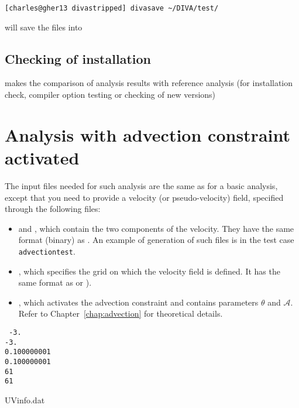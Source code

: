 \example
\begin{lstlisting}[style=Bash]
[charles@gher13 divastripped] divasave ~/DIVA/test/
\end{lstlisting}
will save the files into 

\subsection{Checking of installation}

 makes the comparison of analysis results with reference analysis (for
installation check, compiler option testing or checking of new versions)



\section{Analysis with advection constraint activated}

The input files needed for such analysis are the same as for a basic analysis, except that you need to provide a velocity (or pseudo-velocity) field, specified through the following files:
\begin{itemize}
\item {} and , which contain the two components of the velocity. They have the same format (binary) as . An example of generation of such files is in the test case {\tt advectiontest}.
\item {}, which specifies the grid on which the velocity field is defined. It has the same format as  or ).
\item {}, which activates the advection constraint and contains parameters $\theta$ and $\mathcal{A}$. Refer to Chapter~\ref{chap:advection} for theoretical details.
\end{itemize}

\begin{exfile}[htpb]
\begin{footnotesize}
\texttt{
-3.\\
-3.\\
0.100000001\\
0.100000001\\
61\\
61
} 
\end{footnotesize}
\caption{UVinfo.dat\label{ex:UVinfo.dat}}
\end{exfile}



